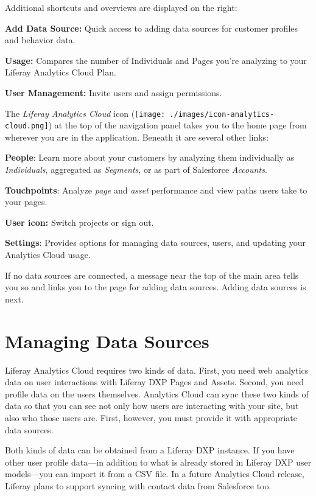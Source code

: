 Additional shortcuts and overviews are displayed on the right:

\textbf{Add Data Source:} Quick access to adding data sources for
customer profiles and behavior data.

\textbf{Usage:} Compares the number of Individuals and Pages you're
analyzing to your Liferay Analytics Cloud Plan.

\textbf{User Management:} Invite users and assign permissions.

The \emph{Liferay Analytics Cloud} icon
(\texttt{[image: ./images/icon-analytics-cloud.png]}) at the top of the
navigation panel takes you to the home page from wherever you are in the
application. Beneath it are several other links:

\textbf{People}: Learn more about your customers by analyzing them
individually as \emph{Individuals}, aggregated as \emph{Segments}, or as
part of Salesforce \emph{Accounts}.

\textbf{Touchpoints}: Analyze \emph{page} and \emph{asset} performance
and view paths users take to your pages.

\textbf{User icon:} Switch projects or sign out.

\textbf{Settings}: Provides options for managing data sources, users,
and updating your Analytics Cloud usage.

If no data sources are connected, a message near the top of the main
area tells you so and links you to the page for adding data sources.
Adding data sources is next.

\section{Managing Data Sources}\label{managing-data-sources}

Liferay Analytics Cloud requires two kinds of data. First, you need web
analytics data on user interactions with Liferay DXP Pages and Assets.
Second, you need profile data on the users themselves. Analytics Cloud
can sync these two kinds of data so that you can see not only how users
are interacting with your site, but also who those users are. First,
however, you must provide it with appropriate data sources.

Both kinds of data can be obtained from a Liferay DXP instance. If you
have other user profile data---in addition to what is already stored in
Liferay DXP user models---you can import it from a CSV file. In a future
Analytics Cloud release, Liferay plans to support syncing with contact
data from Salesforce too.

